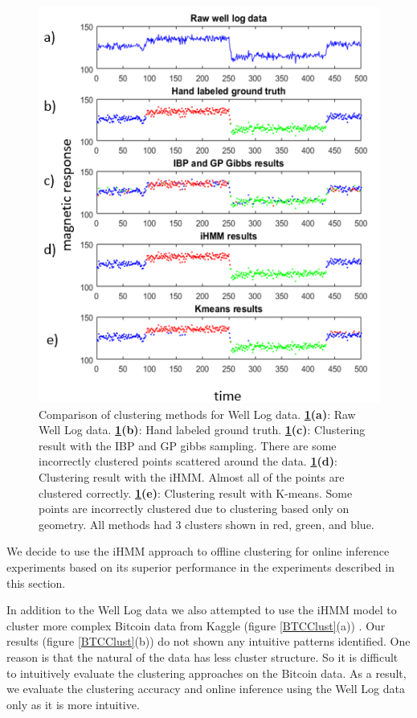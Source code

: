 \documentclass{article}
\begin{document}
\begin{figure}[ht]
\vskip 0.2in
\begin{center}
\centerline{\includegraphics[width=\columnwidth]{OFClust}}
\caption{Comparison of clustering methods for Well Log data. \textbf{\ref{OFClust}(a)}: Raw Well Log data. \textbf{\ref{OFClust}(b)}: Hand labeled ground truth. \textbf{\ref{OFClust}(c)}: Clustering result with the IBP and GP gibbs sampling. There are some incorrectly clustered points scattered around the data. \textbf{\ref{OFClust}(d)}: Clustering result with the iHMM. Almost all of the points are clustered correctly. \textbf{\ref{OFClust}(e)}: Clustering result with K-means. Some points are incorrectly clustered due to clustering based only on geometry. All methods had 3 clusters shown in red, green, and blue.}
\label{OFClust}
\end{center}
\vskip -0.2in
\end{figure} 

We decide to use the iHMM approach to offline clustering for online inference experiments based on its superior performance in the experiments described in this section. 

In addition to the Well Log data we also attempted to use the iHMM model to cluster more complex Bitcoin data from Kaggle (figure \ref{BTCClust}(a)) \cite{KaggleBit}. Our results (figure \ref{BTCClust}(b)) do not shown any intuitive patterns identified. One reason is that the natural of the data has less cluster structure. So it is difficult to intuitively evaluate the clustering approaches on the Bitcoin data. As a result, we evaluate the clustering accuracy and online inference using the Well Log data only as it is more intuitive. 
\end{document}
